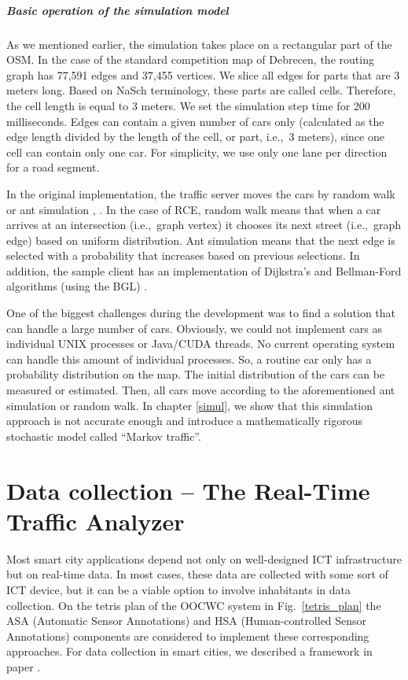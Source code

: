 \documentclass[b5paper,12pt]{report}
\theoremstyle{definition}
\begin{document}
\paragraph{Basic operation of the simulation model}
As we mentioned earlier, the simulation takes place on a rectangular part of the OSM. In the case of the standard competition map of Debrecen, the routing graph has 77,591 edges and 37,455 vertices. We slice all edges for parts that are 3 meters long. Based on NaSch terminology, these parts are called cells. Therefore, the cell length is equal to 3 meters. We set the simulation step time for 200 milliseconds. Edges can contain a given number of cars only (calculated as the edge length divided by the length of the cell, or part, i.e.,~3 meters), since one cell can contain only one car. For simplicity, we use only one lane per direction for a road segment.

In the original implementation, the traffic server moves the cars by random walk or ant simulation \cite{ant1}, \cite{ant2}. In the case of RCE, random walk means that when a car arrives at an intersection (i.e.,~graph vertex) it chooses its next street (i.e.,~graph edge) based on uniform distribution. Ant simulation means that the next edge is selected with a probability that increases based on previous selections. In addition, the sample client has an implementation of Dijkstra's and Bellman-Ford algorithms (using the BGL) \cite{siek2002boost}.

One of the biggest challenges during the development was to find a solution that can handle a large number of cars. Obviously, we could not implement cars as individual UNIX processes or Java/CUDA threads. No current operating system can handle this amount of individual processes. So, a routine car only has a probability distribution on the map. The initial distribution of the cars can be measured or estimated. Then, all cars move according to the aforementioned ant simulation or random walk. In chapter \ref{simul}, we show that this simulation approach is not accurate enough and introduce a mathematically rigorous stochastic model called \enquote{Markov traffic}.

\chapter{Data collection -- The Real-Time Traffic Analyzer}
\label{rtta-chapter}

Most smart city applications depend not only on well-designed ICT infrastructure but on real-time data. In most cases, these data are collected with some sort of ICT device, but it can be a viable option to involve inhabitants in data collection. On the tetris plan of the OOCWC system in Fig.~\ref{tetris_plan} the ASA (Automatic Sensor Annotations) and HSA (Human-controlled Sensor Annotations) components are considered to implement these corresponding approaches. For data collection in smart cities, we described a framework in paper \cite{szabo2013framework}. 
\end{document}
